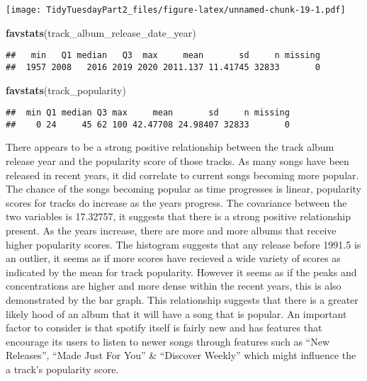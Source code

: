 \documentclass[
]{article}
\newenvironment{Shaded}{\begin{snugshade}}{\end{snugshade}}
\newcommand{\KeywordTok}[1]{\textcolor[rgb]{0.13,0.29,0.53}{\textbf{#1}}}
\newcommand{\NormalTok}[1]{#1}
\begin{document}
\texttt{[image: TidyTuesdayPart2\_files/figure-latex/unnamed-chunk-19-1.pdf]}

\begin{Shaded}
\begin{Highlighting}[]
\KeywordTok{favstats}\NormalTok{(track_album_release_date_year)}
\end{Highlighting}
\end{Shaded}

\begin{verbatim}
##   min   Q1 median   Q3  max     mean       sd     n missing
##  1957 2008   2016 2019 2020 2011.137 11.41745 32833       0
\end{verbatim}

\begin{Shaded}
\begin{Highlighting}[]
\KeywordTok{favstats}\NormalTok{(track_popularity)}
\end{Highlighting}
\end{Shaded}

\begin{verbatim}
##  min Q1 median Q3 max     mean       sd     n missing
##    0 24     45 62 100 42.47708 24.98407 32833       0
\end{verbatim}

There appears to be a strong positive relationship between the track
album release year and the popularity score of those tracks. As many
songs have been released in recent years, it did correlate to current
songs becoming more popular. The chance of the songs becoming popular as
time progresses is linear, popularity scores for tracks do increase as
the years progress. The covariance between the two variables is
17.32757, it suggests that there is a strong positive relationship
present. As the years increase, there are more and more albums that
receive higher popularity scores. The histogram suggests that any
release before 1991.5 is an outlier, it seems as if more scores have
recieved a wide variety of scores as indicated by the mean for track
popularity. However it seems as if the peaks and concentrations are
higher and more dense within the recent years, this is also demonstrated
by the bar graph. This relationship suggests that there is a greater
likely hood of an album that it will have a song that is popular. An
important factor to consider is that spotify itself is fairly new and
has features that encourage its users to listen to newer songs through
features such as ``New Releases'', ``Made Just For You'' \& ``Discover
Weekly'' which might influence the a track's popularity score.
\end{document}
